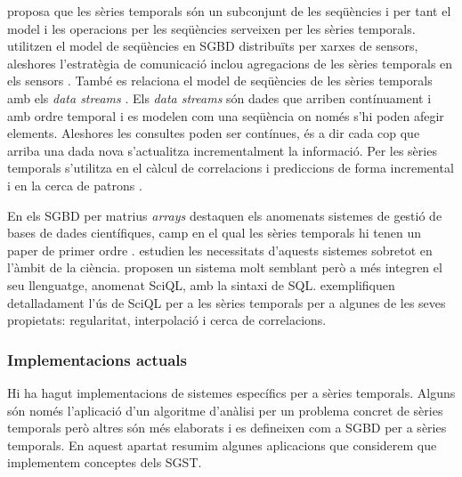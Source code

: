 \textcite{seshadri96:thesis} proposa que les sèries temporals són un subconjunt de les seqüències i per tant el model i les operacions per les seqüències \parencite{seshadri95} serveixen per les sèries temporals. 
\textcite{bonnet01} utilitzen el model de seqüències en SGBD distribuïts per xarxes de sensors, aleshores l'estratègia de comunicació inclou agregacions de les sèries temporals en els sensors \parencite{demers03}.
També es relaciona el model de seqüències de les sèries temporals amb els \emph{data streams} \parencite{babcock02,jagadish95,ogras06}. Els \emph{data streams} són dades que arriben contínuament i amb ordre temporal i es modelen com una seqüència on només s'hi poden afegir elements. Aleshores les consultes poden ser contínues, és a dir cada cop que arriba una dada nova s'actualitza incrementalment la informació. Per les sèries temporals s'utilitza en el càlcul de correlacions i prediccions de forma incremental \parencite{yi00} i en la cerca de patrons \parencite{bai05}.

En els SGBD per matrius \emph{arrays} destaquen els anomenats sistemes de gestió de bases de dades científiques, camp en el qual les sèries temporals hi tenen un paper de primer ordre \parencite{zhang11}. \textcite{stonebraker09:scidb} estudien les necessitats d'aquests sistemes sobretot en l'àmbit de la ciència. \textcite{kersten11} proposen un sistema molt semblant però a més integren el seu llenguatge, anomenat SciQL, amb la sintaxi de SQL. \textcite{zhang11} exemplifiquen detalladament l'ús de SciQL per a les sèries temporals per a algunes de les seves propietats: regularitat, interpolació i cerca de correlacions.



\subsubsection{Implementacions actuals}

Hi ha hagut implementacions de sistemes específics per a sèries temporals. Alguns són només l'aplicació d'un algoritme d'anàlisi per un problema concret de sèries temporals però  altres  són més elaborats i es defineixen com a SGBD per a sèries temporals. 
En aquest apartat resumim algunes aplicacions que considerem que implementem conceptes dels SGST.




